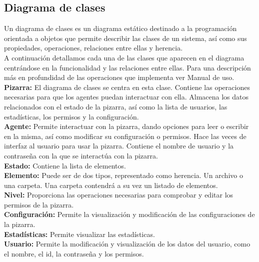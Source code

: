 \subsection{Diagrama de clases}
Un diagrama de clases es un diagrama estático destinado a la programación orientada a objetos que permite describir las clases de un sistema, así como sus propiedades, operaciones, relaciones entre ellas y herencia.\\

A continuación detallamos cada una de las clases que aparecen en el diagrama centrándose en la funcionalidad y las relaciones entre ellas. Para una descripción más en profundidad de las operaciones que implementa ver Manual de uso.\\

\textbf{Pizarra:} El diagrama de clases se centra en esta clase. Contiene las operaciones necesarias para que los agentes puedan interactuar con ella. Almacena los datos relacionados con el estado de la pizarra, así como la lista de usuarios, las estadísticas, los permisos y la configuración.\\

\textbf{Agente:} Permite interactuar con la pizarra, dando opciones para leer o escribir en la misma, así como modificar su configuración o permisos. Hace las veces de interfaz al usuario para usar la pizarra. Contiene el nombre de usuario y la contraseña con la que se interactúa con la pizarra.\\

\textbf{Estado:} Contiene la lista de elementos.\\

\textbf{Elemento:} Puede ser de dos tipos, representado como herencia. Un archivo o una carpeta. Una carpeta contendrá a su vez un listado de elementos.\\

\textbf{Nivel: }Proporciona las operaciones necesarias para comprobar y editar los permisos de la pizarra.\\

\textbf{Configuración: }Permite la visualización y modificación de las configuraciones de la pizarra.\\

\textbf{Estadísticas: }Permite visualizar las estadísticas.\\

\textbf{Usuario:} Permite la modificación y visualización de los datos del usuario, como el nombre, el id, la contraseña y los permisos.


